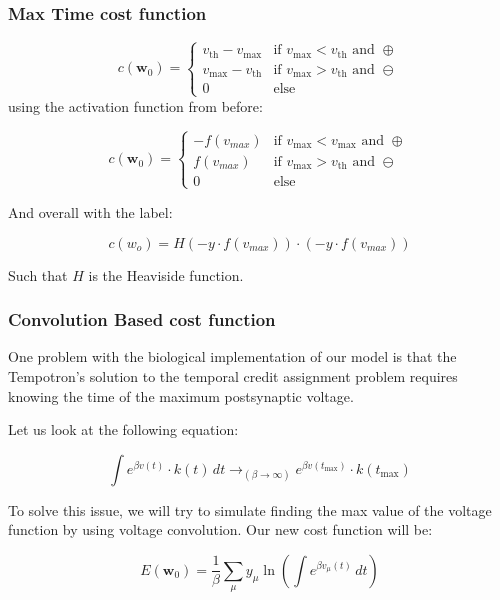 \subsubsection{Max Time cost function}


\begin{equation}
    c(\mathbf{w}_0) = \begin{cases}
    v_{\text{th}} - v_{\text{max}} & \text{if } v_{\text{max}} < v_{\text{th}} \text{ and } \oplus \\
    v_{\text{max}} - v_{\text{th}} & \text{if } v_{\text{max}} > v_{\text{th}} \text{ and } \ominus \\
    0 & \text{else}
    \end{cases}
\end{equation}
using the activation function from before:

\begin{equation}
    c(\mathbf{w}_0) = \begin{cases}
    -f(v_{max}) & \text{if } v_{\text{max}} < v_{\text{max}} \text{ and } \oplus \\
    f(v_{max}) & \text{if } v_{\text{max}} > v_{\text{th}} \text{ and } \ominus \\
    0 & \text{else}
    \end{cases}
\end{equation}

And overall with the label:

\begin{equation}
    c(w_o) = H(-y \cdot f(v_{max})) \cdot (-y \cdot f(v_{max}))
\end{equation}

Such that $H$ is the Heaviside function.

\subsubsection{Convolution Based cost function}

One problem with the biological implementation of our model is that the Tempotron’s solution to the temporal credit assignment problem requires knowing the time of the maximum postsynaptic voltage.

Let us look at the following equation:

\begin{equation}
    \int e^{\beta v(t)} \cdot k(t) \, dt \rightarrow_{(\beta \rightarrow \infty)} e^{\beta v(t_{\text{max}})} \cdot k(t_{\text{max}})
\end{equation}

To solve this issue, we will try to simulate finding the max value of the voltage function by using voltage convolution. Our new cost function will be:

\begin{equation}
    E(\mathbf{w}_0) = \frac{1}{\beta} \sum_{\mu} y_{\mu} \ln\left(\int e^{\beta v_{\mu}(t)} \, dt\right)
\end{equation}
